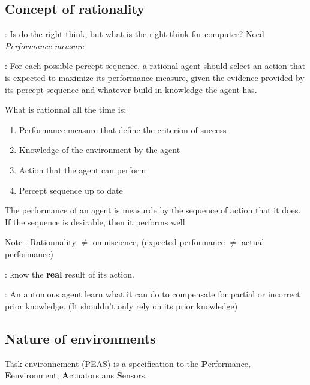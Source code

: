 \subsection{Concept of rationality}
\begin{description}

    \item[Rationality] : Is do the right think, but what is the
        right think for computer? Need \textit{Performance measure}

    \item[Rationnal  agent]  : For  each  possible  percept sequence,  a
    rational agent should select an  action that is expected to maximize
    its performance measure, given the  evidence provided by its percept
    sequence and whatever build-in knowledge the agent has.
    

   \item What is rationnal all the time is:
        \begin{enumerate}
            \item Performance measure that define the criterion of success
            \item Knowledge of the environment by the agent
            \item Action that the agent can perform
            \item Percept sequence up to date
        \end{enumerate}
	
    \item The performance of an agent is measurde by the sequence of action that it does. If the sequence is
    		desirable, then it performs well.
    \item Note : Rationnality $\neq$ omniscience, (expected performance $\neq$ actual performance)

    \item[Omniscience agent] : know the \textbf{real} result of its action.

    \item[Autonomy] :  An automous agent learn what it can do to compensate for partial or incorrect prior
    knowledge. (It shouldn't only rely on its prior knowledge)

\end{description}


\subsection{Nature of environments}
Task environnement (PEAS) is a specification to the \textbf{P}erformance, 
\textbf{E}environment, \textbf{A}ctuators ans \textbf{S}ensors.

